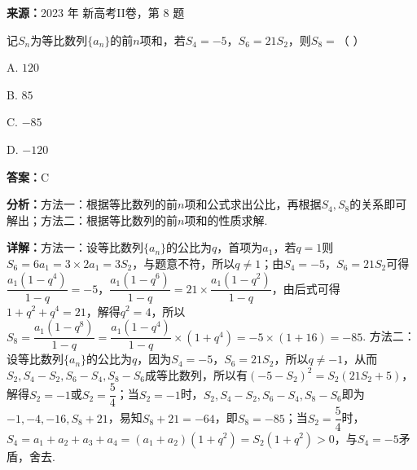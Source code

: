 \begin{question}[points=5]
\textbf{来源：}2023 年 新高考II卷，第 8 题\par
记$S_{n}$为等比数列$\{a_{n}\}$的前$n$项和，若$S_{4}=-5$，$S_{6}=21S_{2}$，则$S_{8}=$（ \quad ）
\begin{choices}
  \item A. $120$
  \item B. $85$
  \item C. $-85$
  \item D. $-120$
\end{choices}
\begin{solution}
\textbf{答案：}C

\textbf{分析：}方法一：根据等比数列的前$n$项和公式求出公比，再根据$S_{4},S_{8}$的关系即可解出；方法二：根据等比数列的前$n$项和的性质求解.

\textbf{详解：}方法一：设等比数列$\{a_{n}\}$的公比为$q$，首项为$a_{1}$，若$q=1$则$S_{6}=6a_{1}=3\times2a_{1}=3S_{2}$，与题意不符，所以$q\neq1$；由$S_{4}=-5$，$S_{6}=21S_{2}$可得$\dfrac{a_{1}(1-q^{4})}{1-q}=-5$，$\dfrac{a_{1}(1-q^{6})}{1-q}=21\times\dfrac{a_{1}(1-q^{2})}{1-q}$，由后式可得$1+q^{2}+q^{4}=21$，解得$q^{2}=4$，所以$S_{8}=\dfrac{a_{1}(1-q^{8})}{1-q}=\dfrac{a_{1}(1-q^{4})}{1-q}\times(1+q^{4})=-5\times(1+16)=-85$.
方法二：设等比数列$\{a_{n}\}$的公比为$q$，因为$S_{4}=-5$，$S_{6}=21S_{2}$，所以$q\neq-1$，从而$S_{2},S_{4}-S_{2},S_{6}-S_{4},S_{8}-S_{6}$成等比数列，所以有$(-5-S_{2})^{2}=S_{2}(21S_{2}+5)$，解得$S_{2}=-1$或$S_{2}=\dfrac{5}{4}$；当$S_{2}=-1$时，$S_{2},S_{4}-S_{2},S_{6}-S_{4},S_{8}-S_{6}$即为$-1,-4,-16,S_{8}+21$，易知$S_{8}+21=-64$，即$S_{8}=-85$；当$S_{2}=\dfrac{5}{4}$时，$S_{4}=a_{1}+a_{2}+a_{3}+a_{4}=(a_{1}+a_{2})(1+q^{2})=S_{2}(1+q^{2})>0$，与$S_{4}=-5$矛盾，舍去.
\end{solution}
\end{question}

